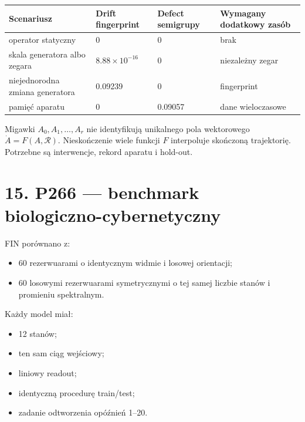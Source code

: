 \documentclass[11pt,a4paper,openany]{report}
\begin{document}
\begin{center}
\begingroup\small
\setlength{\tabcolsep}{2.5pt}
\renewcommand{\arraystretch}{1.16}
\begin{longtable}{@{}p{}p{}p{}p{}@{}}
\toprule
\textbf{Scenariusz} & \textbf{Drift fingerprint} & \textbf{Defect semigrupy} & \textbf{Wymagany dodatkowy zasób} \\
\midrule
\endhead
operator statyczny & 0 & 0 & brak \\
skala generatora albo zegara & \(8.88\times10^{-16}\) & 0 & niezale\.zny zegar \\
niejednorodna zmiana generatora & 0.09239 & 0 & fingerprint \\
pamięć aparatu & 0 & 0.09057 & dane wieloczasowe \\
\bottomrule
\end{longtable}
\endgroup
\end{center}

Migawki \(A_0,A_1,\ldots,A_r\) nie identyfikują unikalnego pola wektorowego \(\dot A=F(A,\mathcal R)\). Nieskończenie wiele funkcji \(F\) interpoluje skończoną trajektorię. Potrzebne są interwencje, rekord aparatu i hold-out.

\chapter{15. P266 --- benchmark biologiczno-cybernetyczny}

FIN porównano z:

\begin{itemize}
\item 
60 rezerwuarami o identycznym widmie i losowej orientacji;

\item 
60 losowymi rezerwuarami symetrycznymi o tej samej liczbie stanów i promieniu spektralnym.

\end{itemize}

Ka\.zdy model miał:

\begin{itemize}
\item 
12 stanów;

\item 
ten sam ciąg wejściowy;

\item 
liniowy readout;

\item 
identyczną procedurę train/\allowbreak{}test;

\item 
zadanie odtworzenia opóźnień 1--20.

\end{itemize}
\end{document}
